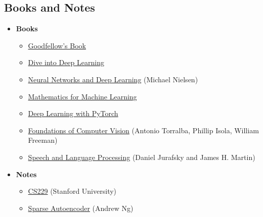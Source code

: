 \documentclass[../../../main.tex]{subfiles}
\begin{document}
\vspace{-0.5\baselineskip}
\subsection*{Books and Notes}
\vspace{-0.5\baselineskip}
\begin{itemize}[noitemsep]
\item \textbf{Books}
\begin{itemize}[noitemsep]
\item
\href{https://www.deeplearningbook.org/}{Goodfellow's Book}
\item
\href{https://d2l.ai/}{Dive into Deep Learning}
\item
\href{http://neuralnetworksanddeeplearning.com/}{Neural Networks and Deep Learning} (Michael Nielsen)
\item
\href{https://mml-book.github.io/book/mml-book.pdf}{Mathematics for Machine Learning}
\item
\href{https://isip.piconepress.com/courses/temple/ece\_4822/resources/books/Deep-Learning-with-PyTorch.pdf}{Deep Learning with PyTorch}
\item
\href{https://visionbook.mit.edu/}{Foundations of Computer Vision}
(Antonio Torralba, Phillip Isola, William Freeman)
\item
\href{https://web.stanford.edu/~jurafsky/slp3/ed3book_jan26.pdf}{Speech and Language Processing}
(Daniel Jurafsky and James H. Martin)
\end{itemize}

\item \textbf{Notes}
\begin{itemize}[noitemsep]
\item
\href{https://cs229.stanford.edu/syllabus-autumn2018.html}{CS229} (Stanford University)
\item
\href{https://web.stanford.edu/class/cs294a/sparseAutoencoder.pdf}{Sparse Autoencoder} (Andrew Ng)
\end{itemize}
\end{itemize}


\vspace{-0.5\baselineskip}
\end{document}
